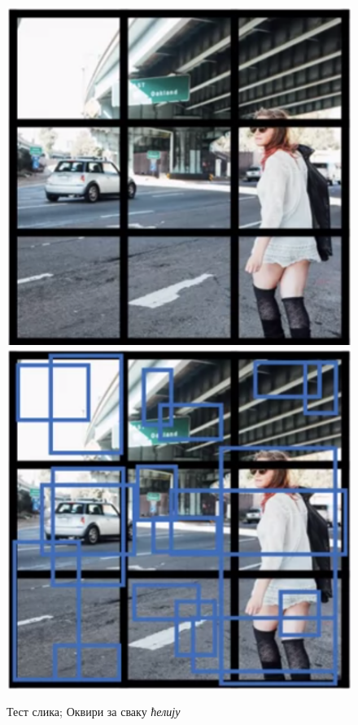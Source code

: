 \documentclass[12pt, а4paper]{article}
\begin{document}
\begin{figure}[H]
  \centering
      \includegraphics[scale=0.5]{slike/ngYOLO1.png}
      \includegraphics[scale=0.5]{slike/ngYOLO2.png}
  \caption{Тест слика; Оквири за сваку \textit{ћелију}}
  \label{fig:ng_YOLO12}
\end{figure}
\end{document}
